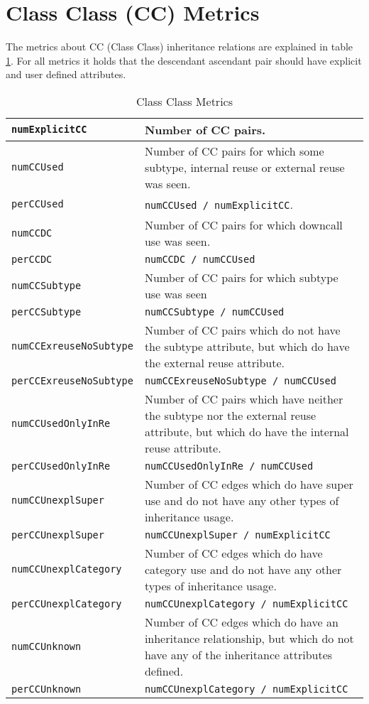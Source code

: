 \documentclass{uvamscse}
\begin{document}
\section{Class Class (CC) Metrics}
The metrics about CC (Class Class) inheritance relations are explained in table \ref{table:CCMetrics}. For all metrics it holds that the descendant ascendant pair should have explicit and user defined attributes.

\begin{table} [h!]
\begin{flushleft}
\begin{tabular}[c]{| p{40mm} | p{110mm} |}
  \hline
  \texttt{numExplicitCC} &  Number of CC pairs.\\
  \hline  
  \texttt{numCCUsed} &  Number of CC pairs for which some subtype, internal reuse or external reuse was	seen. \\
  \texttt{perCCUsed} &  \texttt{numCCUsed / numExplicitCC}.\\
  \hline
  \texttt{numCCDC} 	 &   Number of CC pairs for which downcall use was seen.\\
  \texttt{perCCDC}   &   \texttt{numCCDC / numCCUsed} \\
  \hline
  \texttt{numCCSubtype} &  Number of CC pairs for which subtype use was seen \\
  \texttt{perCCSubtype} &  \texttt{numCCSubtype / numCCUsed} \\
  \hline
  \texttt{numCCExreuseNoSubtype} &  Number of CC pairs which do not have the subtype attribute, but which do have the external reuse attribute. \\
  \texttt{perCCExreuseNoSubtype} & \texttt{numCCExreuseNoSubtype / numCCUsed}  \\
  \hline
  \texttt{numCCUsedOnlyInRe} & Number of CC pairs which have neither the subtype nor the external reuse attribute, but which do have the internal reuse attribute. \\
  \texttt{perCCUsedOnlyInRe} &   \texttt{numCCUsedOnlyInRe / numCCUsed} \\
  \hline
  \texttt{numCCUnexplSuper} & Number of CC edges which do have super use and do not have any other types of inheritance usage. \\
  \texttt{perCCUnexplSuper} & 	\texttt{numCCUnexplSuper / numExplicitCC } \\
  \hline 
  \texttt{numCCUnexplCategory} & Number of CC edges which do have category use and do not have any other types of inheritance usage. \\
  \texttt{perCCUnexplCategory} & 	\texttt{numCCUnexplCategory / numExplicitCC } \\
  \hline 
  \texttt{numCCUnknown} & Number of CC edges which do have an inheritance relationship, but which do not have any of the inheritance attributes defined. \\
  \texttt{perCCUnknown} & 	\texttt{numCCUnexplCategory / numExplicitCC } \\
  \hline 
\end{tabular}
\end{flushleft}
\caption{Class Class Metrics}
\label{table:CCMetrics}
\end{table}
\end{document}
